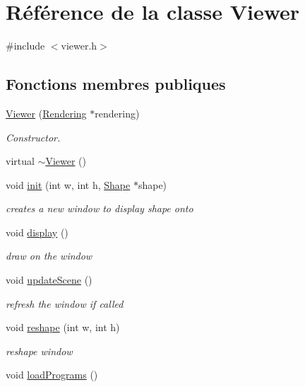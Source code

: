 \hypertarget{class_viewer}{}\section{Référence de la classe Viewer}
\label{class_viewer}


{\ttfamily \#include $<$viewer.\+h$>$}

\subsection*{Fonctions membres publiques}
\begin{DoxyCompactItemize}
\item 
\hyperlink{class_viewer_a29d3e7c2922835cbd92c285c709dbe30}{Viewer} (\hyperlink{class_rendering}{Rendering} $\ast$rendering)
\begin{DoxyCompactList}\small\item\em Constructor. \end{DoxyCompactList}\item 
virtual \hyperlink{class_viewer_a324e5a6a1532fe5eac3f3b0e4792b2da}{$\sim$\+Viewer} ()
\item 
void \hyperlink{class_viewer_a2d57e05f6d9c450431e01ffd82eb3b5e}{init} (int w, int h, \hyperlink{class_shape}{Shape} $\ast$shape)
\begin{DoxyCompactList}\small\item\em creates a new window to display shape onto \end{DoxyCompactList}\item 
void \hyperlink{class_viewer_a277a934adb86150b09d044b7cee822f8}{display} ()
\begin{DoxyCompactList}\small\item\em draw on the window \end{DoxyCompactList}\item 
void \hyperlink{class_viewer_a7deac2bd87e6c5a76c6eb600306d6096}{update\+Scene} ()
\begin{DoxyCompactList}\small\item\em refresh the window if called \end{DoxyCompactList}\item 
void \hyperlink{class_viewer_ab4e8ad8f2d8c73cc9312785e6aed9e75}{reshape} (int w, int h)
\begin{DoxyCompactList}\small\item\em reshape window \end{DoxyCompactList}\item 
void \hyperlink{class_viewer_a7afbf6081ffc5d44f4939b0d579d0b58}{load\+Programs} ()

\end{DoxyCompactItemize}
